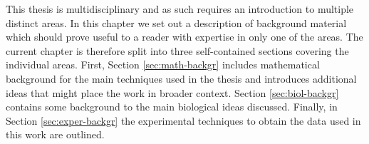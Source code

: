 
This thesis is multidisciplinary and as such requires an introduction to multiple distinct areas. In this chapter we set out a description of background material which should prove useful to a reader with expertise in only one of the areas. The current chapter is therefore split into three self-contained sections covering the individual areas. First, Section \ref{sec:math-backgr} includes mathematical background for the main techniques used in the thesis and introduces additional ideas that might place the work in broader context. Section \ref{sec:biol-backgr} contains some background to the main biological ideas discussed. Finally, in Section \ref{sec:exper-backgr} the experimental techniques to obtain the data used in this work are outlined.


